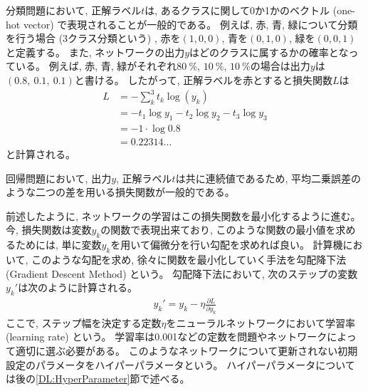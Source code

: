 分類問題において, 正解ラベル$t$は, あるクラスに関して0か1かのベクトル (one-hot vector) で表現されることが一般的である。
例えば, 赤, 青, 緑について分類を行う場合 (3クラス分類という) , 赤を$(1, 0, 0)$, 青を$(0, 1, 0)$, 緑を$(0, 0, 1)$と定義する。
また, ネットワークの出力$y$はどのクラスに属するかの確率となっている。
例えば, 赤, 青, 緑がそれぞれ$80\ \%$, $10\ \%$, $10\ \%$の場合は出力$y$は$(0.8,\ 0.1,\ 0.1)$と書ける。
したがって, 正解ラベルを赤とすると損失関数$L$は
\begin{equation}
 \begin{split}
  L &= - \sum^3_k t_k \log{(y_k)} \\
    &= - t_1 \log{y_1} - t_2 \log{y_2} - t_3 \log{y_3} \\
    &= - 1 \cdot \log{0.8}\\
    &= 0.22314...
 \end{split}
\end{equation}
と計算される。

回帰問題において, 出力$y$, 正解ラベル$t$は共に連続値であるため, 平均二乗誤差のような二つの差を用いる損失関数が一般的である。

前述したように, ネットワークの学習はこの損失関数を最小化するように進む。
今, 損失関数は変数$y_k$の関数で表現出来ており, このような関数の最小値を求めるためには, 単に変数$y_k$を用いて偏微分を行い勾配を求めれば良い。
計算機において, このような勾配を求め, 徐々に関数を最小化していく手法を勾配降下法 (Gradient Descent Method) という。
勾配降下法において, 次のステップの変数$y_k'$は次のように計算される。
\begin{equation}
 \begin{split}
  y_k' = y_k - \eta \frac{\partial L}{\partial y_k}
 \end{split}
\end{equation}
ここで, ステップ幅を決定する定数$\eta$をニューラルネットワークにおいて学習率 (learning rate) という。
学習率は0.001などの定数を問題やネットワークによって適切に選ぶ必要がある。
このようなネットワークについて更新されない初期設定のパラメータをハイパーパラメータという。
ハイパーパラメータについては後の\ref{DL:HyperParameter}節で述べる。

